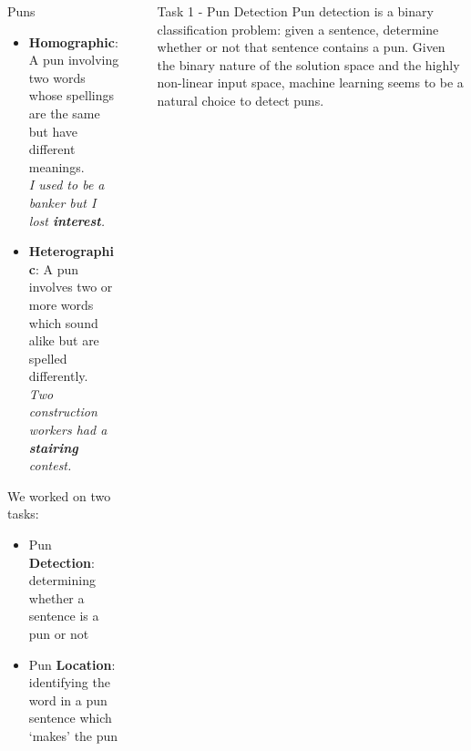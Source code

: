 \documentclass[final]{beamer}
\newlength{\sepwid}
\newlength{\onecolwid}
\newlength{\twocolwid}
\begin{document}
\begin{frame}[t]
\begin{columns}[t]
\begin{column}{\onecolwid}
\begin{block}{Puns}
{					\begin{itemize}
						\item {\textbf{Homographic}: A pun involving two words whose spellings are the same but have different meanings.\\
								\textit{I used to be a banker but I lost \textbf{interest}.}}
						\item {\textbf{Heterographic}: A pun involves two or more words which sound alike but are spelled differently.\\
								\textit{Two construction workers had a \textbf{stairing} contest.}}
					\end{itemize}
					\vspace{40mm}
					We worked on two tasks: 
					\begin{itemize}
						\item {Pun \textbf{Detection}: determining whether a sentence is a pun or not}
						\item {Pun \textbf{Location}: identifying the word in a pun sentence which `makes' the pun}
					\end{itemize}
				}
			\end{block}
		\end{column}
		\begin{column}{\sepwid}\end{column} %
		\begin{column}{\twocolwid}
			\begin{columns}[t,totalwidth=\twocolwid] %
				\begin{column}{\onecolwid}\vspace{-.6in}
					\vspace{40mm}
					\begin{block}{Task 1 - Pun Detection}
						{\large 
							Pun detection is a binary classification problem: given a sentence, determine whether or not that sentence contains a pun. Given the binary nature of the solution space and the highly non-linear input space, machine learning seems to be a natural choice to detect puns.\\
}
\end{block}
\end{column}
\end{columns}
\end{column}
\end{columns}
\end{frame}
\end{document}
